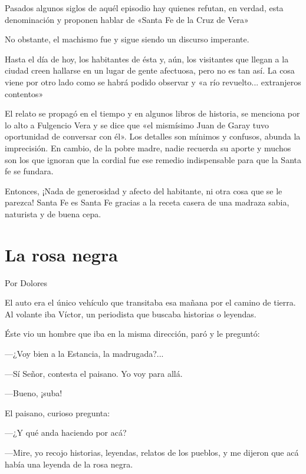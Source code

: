 \documentclass[11pt,twoside,openright,a5paper]{book}
\begin{document}
Pasados algunos siglos de aquél episodio hay quienes refutan, en verdad, esta denominación y proponen hablar de «Santa Fe de la Cruz de Vera»

No obstante, el machismo fue y sigue siendo un discurso imperante.

Hasta el día de hoy, los habitantes de ésta y, aún, los visitantes que llegan a la ciudad creen hallarse en un lugar de gente afectuosa, pero no es tan así. La cosa viene por otro lado como se habrá podido observar y «a río revuelto... extranjeros contentos»

El relato se propagó en el tiempo y en algunos libros de historia, se menciona por lo alto a Fulgencio Vera y se dice que «el mismísimo Juan de Garay tuvo oportunidad de conversar con él». Los detalles son mínimos y confusos, abunda la imprecisión. En cambio, de la pobre madre, nadie recuerda su aporte y muchos son los que ignoran que la cordial fue ese remedio indispensable para que la Santa fe se fundara. 

Entonces, ¡Nada de generosidad y afecto del habitante, ni otra cosa que se le parezca! Santa Fe es Santa Fe gracias a la receta casera de una madraza sabia, naturista y de buena cepa.

\section*{La rosa negra}

                                                                                                   \begin{flushright}Por Dolores\end{flushright}

El auto era el único vehículo que transitaba esa mañana por el camino de tierra. Al volante iba Víctor, un periodista que buscaba historias o leyendas.

Éste vio un hombre que iba en la misma dirección, paró y le preguntó:

---¿Voy bien a la Estancia, la madrugada?...

---Sí Señor, contesta el paisano. Yo voy para allá.

---Bueno, ¡suba!

El paisano, curioso pregunta:

---¿Y qué anda haciendo por acá?

---Mire, yo recojo historias, leyendas, relatos de los pueblos, y me dijeron que acá había una leyenda de la rosa negra.
\end{document}
